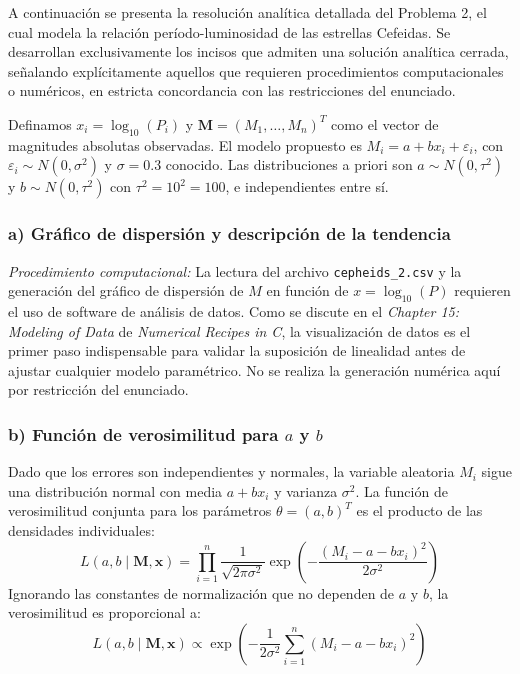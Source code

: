 \documentclass[12pt]{article}
\begin{document}
A continuación se presenta la resolución analítica detallada del Problema 2, el cual modela la relación período-luminosidad de las estrellas Cefeidas. Se desarrollan exclusivamente los incisos que admiten una solución analítica cerrada, señalando explícitamente aquellos que requieren procedimientos computacionales o numéricos, en estricta concordancia con las restricciones del enunciado.

Definamos $x_i = \log_{10}(P_i)$ y $\mathbf{M} = (M_1, \dots, M_n)^T$ como el vector de magnitudes absolutas observadas. El modelo propuesto es $M_i = a + b x_i + \varepsilon_i$, con $\varepsilon_i \sim N(0, \sigma^2)$ y $\sigma = 0.3$ conocido. Las distribuciones a priori son $a \sim N(0, \tau^2)$ y $b \sim N(0, \tau^2)$ con $\tau^2 = 10^2 = 100$, e independientes entre sí.

\subsubsection*{a) Gráfico de dispersión y descripción de la tendencia}
\textit{Procedimiento computacional:} La lectura del archivo \texttt{cepheids\_2.csv} y la generación del gráfico de dispersión de $M$ en función de $x = \log_{10}(P)$ requieren el uso de software de análisis de datos. Como se discute en el \textit{Chapter 15: Modeling of Data} de \textit{Numerical Recipes in C}, la visualización de datos es el primer paso indispensable para validar la suposición de linealidad antes de ajustar cualquier modelo paramétrico. No se realiza la generación numérica aquí por restricción del enunciado.

\subsubsection*{b) Función de verosimilitud para $a$ y $b$}
Dado que los errores son independientes y normales, la variable aleatoria $M_i$ sigue una distribución normal con media $a + b x_i$ y varianza $\sigma^2$. La función de verosimilitud conjunta para los parámetros $\theta = (a, b)^T$ es el producto de las densidades individuales:
$$
L(a, b \mid \mathbf{M}, \mathbf{x}) = \prod_{i=1}^n \frac{1}{\sqrt{2\pi\sigma^2}} \exp\left( -\frac{(M_i - a - b x_i)^2}{2\sigma^2} \right)
$$
Ignorando las constantes de normalización que no dependen de $a$ y $b$, la verosimilitud es proporcional a:
$$
L(a, b \mid \mathbf{M}, \mathbf{x}) \propto \exp\left( -\frac{1}{2\sigma^2} \sum_{i=1}^n (M_i - a - b x_i)^2 \right)
$$
\end{document}
